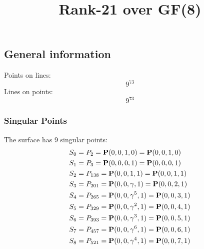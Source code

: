 \documentclass{article}
\newcommand\setTBstruts{\def\T{\rule{0pt}{2.6ex}}%
\def\B{\rule[-1.2ex]{0pt}{0pt}}}
\newcommand{\bP}{{\bf P}}
\begin{document}
 
\setTBstruts



{\allowdisplaybreaks%






\title{Rank-21 over GF(8)}
\author{}%
\maketitle%
%
{}



\subsection*{General information}
Points on lines:
$$
9^{73}$$
Lines on points:
$$
9^{73}$$
\subsubsection*{Singular Points}
The surface has 9 singular points:\\
\begin{align*}
S_{0} &= P_{2}=\bP(0, 0, 1, 0) = \bP(0, 0, 1, 0)\\
S_{1} &= P_{3}=\bP(0, 0, 0, 1) = \bP(0, 0, 0, 1)\\
S_{2} &= P_{138}=\bP(0, 0, 1, 1) = \bP(0, 0, 1, 1)\\
S_{3} &= P_{201}=\bP(0, 0, \gamma , 1) = \bP(0, 0, 2, 1)\\
S_{4} &= P_{265}=\bP(0, 0, \gamma^{5}, 1) = \bP(0, 0, 3, 1)\\
S_{5} &= P_{329}=\bP(0, 0, \gamma^{2}, 1) = \bP(0, 0, 4, 1)\\
S_{6} &= P_{393}=\bP(0, 0, \gamma^{3}, 1) = \bP(0, 0, 5, 1)\\
S_{7} &= P_{457}=\bP(0, 0, \gamma^{6}, 1) = \bP(0, 0, 6, 1)\\
S_{8} &= P_{521}=\bP(0, 0, \gamma^{4}, 1) = \bP(0, 0, 7, 1)\\
\end{align*}
}
\end{document}
